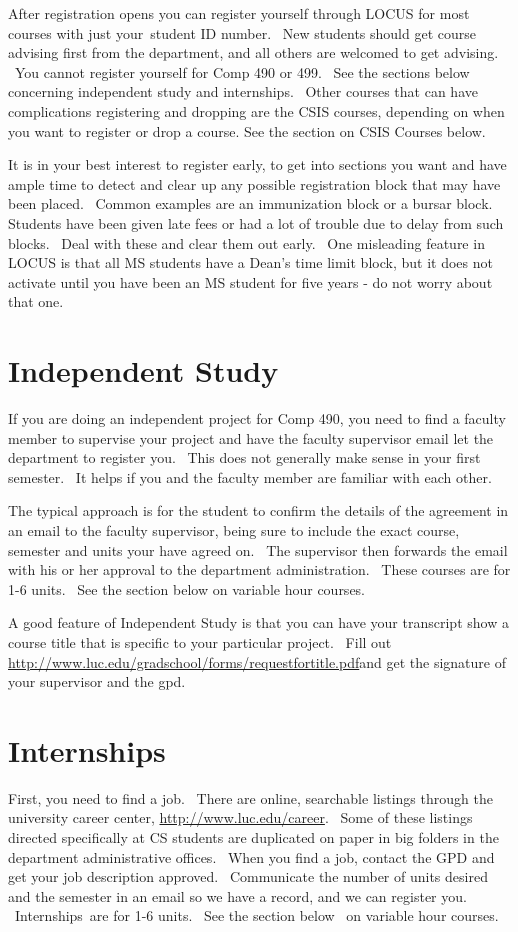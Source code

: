 \documentclass[letterpaper,10pt,english]{sphinxmanual}
\begin{document}
After registration opens you can register yourself through LOCUS for
most courses with just your student ID number.  New students should get
course advising first from the department, and all others are welcomed
to get advising.  You cannot register yourself for Comp 490 or 499.  See
the sections below concerning independent study and internships.  Other
courses that can have complications registering and dropping are the
CSIS courses, depending on when you want to register or drop a course.
See the section on CSIS Courses below.

It is in your best interest to register early, to get into sections you
want and have ample time to detect and clear up any possible
registration block that may have been placed.  Common examples are an
immunization block or a bursar block.  Students have been given late
fees or had a lot of trouble due to delay from such blocks.  Deal with
these and clear them out early.  One misleading feature in LOCUS is that
all MS students have a Dean's time limit block, but it does not activate
until you have been an MS student for five years - do not worry about
that one.


\section{Independent Study}
\label{regulations:independent-study}
If you are doing an independent project for Comp 490, you need to find a
faculty member to supervise your project and have the faculty supervisor
email let the department to register you.  This does not generally make
sense in your first semester.  It helps if you and the faculty member
are familiar with each other.

The typical approach is for the student to confirm the details of the
agreement in an email to the faculty supervisor, being sure to include
the exact course, semester and units your have agreed on.  The
supervisor then forwards the email with his or her approval to the
department administration.  These courses are for 1-6 units.  See the
section below on variable hour courses.

A good feature of Independent Study is that you can have your transcript
show a course title that is specific to your particular project.  Fill
out
\href{http://www.luc.edu/gradschool/forms/requestfortitle.pdf}{http://www.luc.edu/gradschool/forms/requestfortitle.pdf}and
get the signature of your supervisor and the gpd.


\section{Internships}
\label{regulations:internships}
First, you need to find a job.  There are online, searchable listings
through the university career center,
\href{http://www.luc.edu/career}{http://www.luc.edu/career}.  Some of these
listings directed specifically at CS students are duplicated on paper in
big folders in the department administrative offices.  When you find a
job, contact the GPD and get your job description approved.  Communicate
the number of units desired and the semester in an email so we have a
record, and we can register you.  Internships are for 1-6 units.  See
the section below  on variable hour courses.
\end{document}
